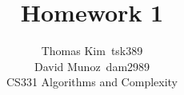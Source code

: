 \documentclass[12pt]{article}
\begin{document}
\title{Homework 1}
\author{Thomas Kim~tsk389\\David Munoz~dam2989\\
CS331 Algorithms and Complexity}

\renewcommand{\arraystretch}{2.0}

\date{} %


\maketitle

\onecolumn








\end{document}
